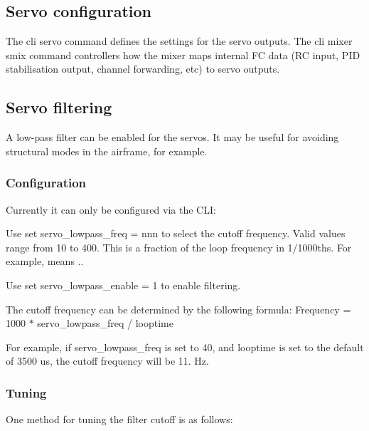 \subsection*{Servo configuration}

The cli {\ttfamily servo} command defines the settings for the servo outputs. The cli mixer {\ttfamily smix} command controllers how the mixer maps internal F\+C data (R\+C input, P\+I\+D stabilisation output, channel forwarding, etc) to servo outputs.

\subsection*{Servo filtering}

A low-\/pass filter can be enabled for the servos. It may be useful for avoiding structural modes in the airframe, for example.

\subsubsection*{Configuration}

Currently it can only be configured via the C\+L\+I\+:


\begin{DoxyEnumerate}
\item Use {\ttfamily set servo\+\_\+lowpass\+\_\+freq = nnn} to select the cutoff frequency. Valid values range from 10 to 400. This is a fraction of the loop frequency in 1/1000ths. For example, {} means {.}.
\item Use {\ttfamily set servo\+\_\+lowpass\+\_\+enable = 1} to enable filtering.
\end{DoxyEnumerate}

The cutoff frequency can be determined by the following formula\+: {\ttfamily Frequency = 1000 $\ast$ servo\+\_\+lowpass\+\_\+freq / looptime}

For example, if {\ttfamily servo\+\_\+lowpass\+\_\+freq} is set to 40, and looptime is set to the default of 3500 us, the cutoff frequency will be 11. Hz.

\subsubsection*{Tuning}

One method for tuning the filter cutoff is as follows\+:


